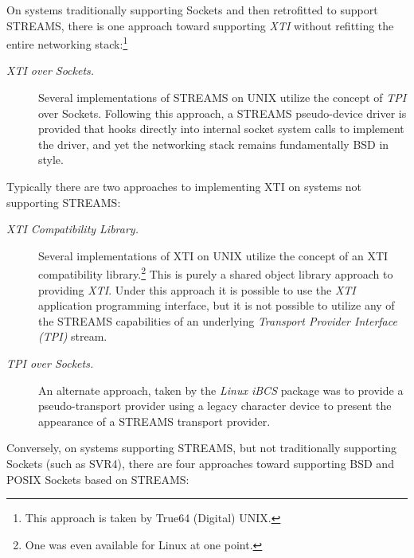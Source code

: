 \documentclass[letterpaper,final,notitlepage,twocolumn,10pt,twoside]{article}
\begin{document}
On systems traditionally supporting Sockets and then retrofitted to support
STREAMS, there is one approach toward supporting \textsl{XTI} without
refitting the entire networking stack:\footnote{This approach is taken by
True64 (Digital) UNIX.}

\begin{description}

\item[{\it XTI over Sockets.}]

Several implementations of STREAMS on UNIX utilize the concept of \textsl{TPI}
over Sockets.  Following this approach, a STREAMS pseudo-device driver is
provided that hooks directly into internal socket system calls to implement
the driver, and yet the networking stack remains fundamentally BSD in style.

\end{description}

Typically there are two approaches to implementing XTI on systems not
supporting STREAMS:

\begin{description}

\item[{\it XTI Compatibility Library.}]

Several implementations of XTI on UNIX utilize the concept of an XTI
compatibility library.\footnote{One was even available for Linux at one
point.}  This is purely a shared object library approach to providing
\textsl{XTI}.  Under this approach it is possible to use the \textsl{XTI}
application programming interface, but it is not possible to utilize any of
the STREAMS capabilities of an underlying \textit{Transport Provider Interface
(TPI)} stream.

\item[{\it TPI over Sockets.}]

An alternate approach, taken by the \textsl{Linux iBCS} package was to provide
a pseudo-transport provider using a legacy character device to present the
appearance of a STREAMS transport provider.

\end{description}

Conversely, on systems supporting STREAMS, but not traditionally supporting
Sockets (such as SVR4), there are four approaches toward supporting BSD and
POSIX Sockets based on STREAMS:
\end{document}
